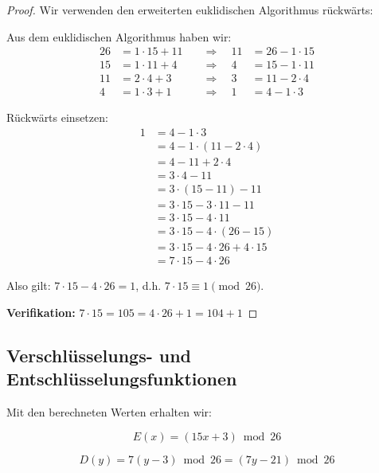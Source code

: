 ﻿\documentclass[12pt,a4paper]{article}
\begin{document}
	\begin{proof}
		Wir verwenden den erweiterten euklidischen Algorithmus rückwärts:
		
		Aus dem euklidischen Algorithmus haben wir:
		\begin{align}
			26 &= 1 \cdot 15 + 11 \quad &\Rightarrow \quad 11 &= 26 - 1 \cdot 15 \\
			15 &= 1 \cdot 11 + 4 \quad &\Rightarrow \quad 4 &= 15 - 1 \cdot 11 \\
			11 &= 2 \cdot 4 + 3 \quad &\Rightarrow \quad 3 &= 11 - 2 \cdot 4 \\
			4 &= 1 \cdot 3 + 1 \quad &\Rightarrow \quad 1 &= 4 - 1 \cdot 3
		\end{align}
		
		Rückwärts einsetzen:
		\begin{align}
			1 &= 4 - 1 \cdot 3 \\
			&= 4 - 1 \cdot (11 - 2 \cdot 4) \\
			&= 4 - 11 + 2 \cdot 4 \\
			&= 3 \cdot 4 - 11 \\
			&= 3 \cdot (15 - 11) - 11 \\
			&= 3 \cdot 15 - 3 \cdot 11 - 11 \\
			&= 3 \cdot 15 - 4 \cdot 11 \\
			&= 3 \cdot 15 - 4 \cdot (26 - 15) \\
			&= 3 \cdot 15 - 4 \cdot 26 + 4 \cdot 15 \\
			&= 7 \cdot 15 - 4 \cdot 26
		\end{align}
		
		Also gilt: $7 \cdot 15 - 4 \cdot 26 = 1$, d.h. $7 \cdot 15 \equiv 1 \pmod{26}$.
		
		\textbf{Verifikation:} $7 \cdot 15 = 105 = 4 \cdot 26 + 1 = 104 + 1$ \checkmark
	\end{proof}
	
	\subsection{Verschlüsselungs- und Entschlüsselungsfunktionen}
	
	Mit den berechneten Werten erhalten wir:
	
	\begin{equation}
		\boxed{E(x) = (15x + 3) \bmod 26}
	\end{equation}
	
	\begin{equation}
		\boxed{D(y) = 7(y - 3) \bmod 26 = (7y - 21) \bmod 26}
	\end{equation}
	
\end{document}
